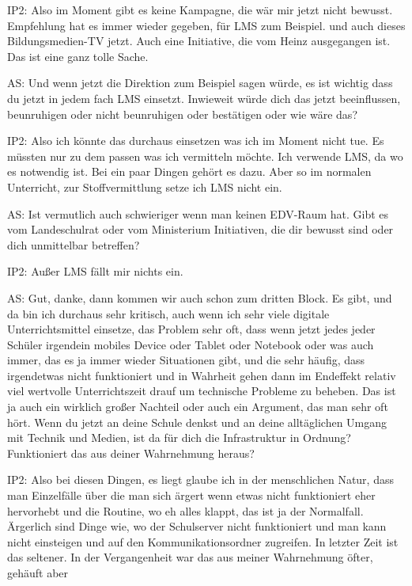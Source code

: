 \documentclass[fontsize=11pt,paper=a4]{scrbook}
\begin{document}
{\begin{itemize*}
\item[IP2:] Also im Moment gibt es keine Kampagne, die wär mir jetzt nicht bewusst.
Empfehlung hat es immer wieder gegeben, für LMS zum Beispiel.
und auch dieses Bildungsmedien-TV jetzt. Auch eine Initiative, die vom Heinz ausgegangen ist. Das ist eine ganz tolle Sache.
\item[AS:] Und 
wenn jetzt die
Direktion zum Beispiel sagen würde, es ist wichtig dass du jetzt in jedem fach
LMS einsetzt. Inwieweit würde
dich das jetzt beeinflussen, beunruhigen oder nicht
beunruhigen oder bestätigen oder wie wäre das?
\item[IP2:] Also ich könnte das durchaus einsetzen
was ich im Moment nicht tue. 
Es müssten nur zu dem passen was ich vermitteln möchte. Ich verwende LMS, da wo es notwendig ist. Bei ein paar Dingen gehört es dazu. Aber so im normalen Unterricht, zur Stoffvermittlung setze ich LMS nicht ein.
\item[AS:] Ist vermutlich auch schwieriger wenn man keinen EDV-Raum hat. Gibt es vom Landeschulrat oder vom Ministerium Initiativen, die dir bewusst sind oder dich unmittelbar betreffen? 
\item[IP2:] Außer LMS fällt mir nichts ein.
\item[AS:] Gut, danke, dann kommen wir auch schon zum dritten Block. Es gibt, und da bin ich durchaus sehr kritisch, auch wenn ich sehr viele digitale Unterrichtsmittel einsetze, das Problem sehr oft, dass 
wenn jetzt jedes jeder Schüler irgendein
mobiles Device oder Tablet oder Notebook
oder was auch immer, das es ja immer
wieder Situationen gibt, und die sehr
häufig, dass irgendetwas nicht
funktioniert und in Wahrheit gehen dann
im Endeffekt relativ viel wertvolle
Unterrichtszeit drauf um technische
Probleme zu beheben. Das ist ja auch ein
wirklich großer Nachteil oder auch ein
Argument, das man sehr oft hört. Wenn du
jetzt an deine Schule denkst und an deine alltäglichen Umgang mit Technik
und Medien, ist da für dich die
Infrastruktur in Ordnung? Funktioniert
das aus deiner Wahrnehmung heraus?
\item[IP2:] Also bei diesen Dingen, es liegt glaube ich in der menschlichen Natur, dass man Einzelfälle über
die man sich ärgert wenn etwas nicht
funktioniert eher hervorhebt und die Routine, wo eh alles klappt, das ist ja der Normalfall.
Ärgerlich sind Dinge wie, wo der Schulserver nicht
funktioniert und man kann nicht einsteigen und auf den Kommunikationsordner zugreifen. In letzter Zeit ist das seltener. In der Vergangenheit war das aus 
meiner Wahrnehmung öfter, gehäuft aber

\end{itemize*}}
\end{document}
